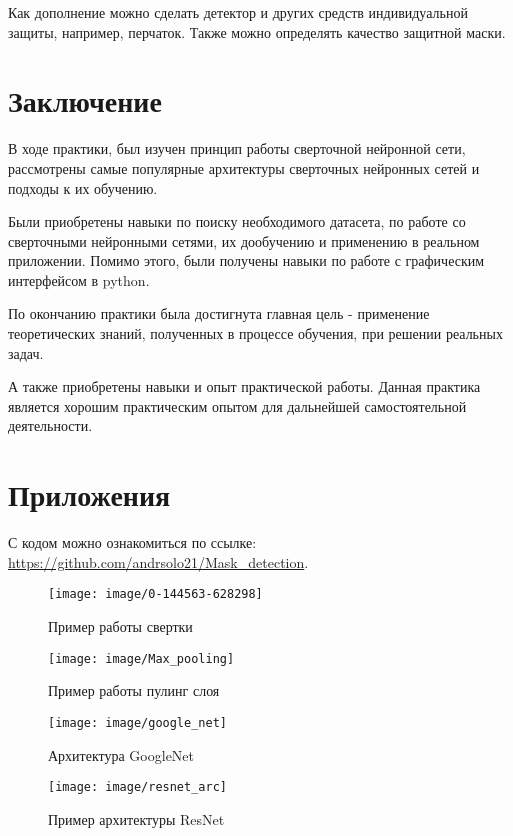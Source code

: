 \documentclass[a4paper,14pt]{article}
\begin{document}
	Как дополнение можно сделать детектор и других средств индивидуальной защиты, например, перчаток.
	Также можно определять качество защитной маски.
	
	\pagebreak
	\section{Заключение}
	
	В ходе практики, был изучен принцип работы сверточной нейронной сети,  рассмотрены самые популярные архитектуры сверточных нейронных сетей и подходы к их обучению.
	
	Были приобретены навыки по поиску необходимого датасета, по работе со сверточными нейронными сетями, их дообучению и применению в реальном приложении.
	Помимо этого, были получены навыки по работе с графическим интерфейсом в python.
	
	По окончанию практики была достигнута главная цель - применение теоретических знаний, полученных в процессе обучения, при решении реальных задач.
	
	А также приобретены навыки и опыт практической работы.
	Данная практика является хорошим практическим опытом для дальнейшей самостоятельной деятельности.
	
	\pagebreak
	\section{Приложения}
	
	С кодом можно ознакомиться по ссылке: \href{https://github.com/andrsolo21/Mask_detection}{https://github.com/andrsolo21/Mask\_detection}.
	
	\begin{figure}[H]
		\centering
		\texttt{[image: image/0-144563-628298]}
		\caption{Пример работы свертки}
		\label{fig:0-144563-628298}
	\end{figure}
	
	\begin{figure}[H]
		\centering
		\texttt{[image: image/Max\_pooling]}
		\caption{Пример работы пулинг слоя}
		\label{fig:maxpooling}
	\end{figure}
	
	\begin{figure}[H]
		\centering
		\texttt{[image: image/google\_net]}
		\caption{Архитектура GoogleNet}
		\label{fig:googlenet}
	\end{figure}
	
	
	\begin{figure}[H]
		\centering
		\texttt{[image: image/resnet\_arc]}
		\caption{Пример архитектуры ResNet}
		\label{fig:resnetarc}
	\end{figure}
	
\end{document}
